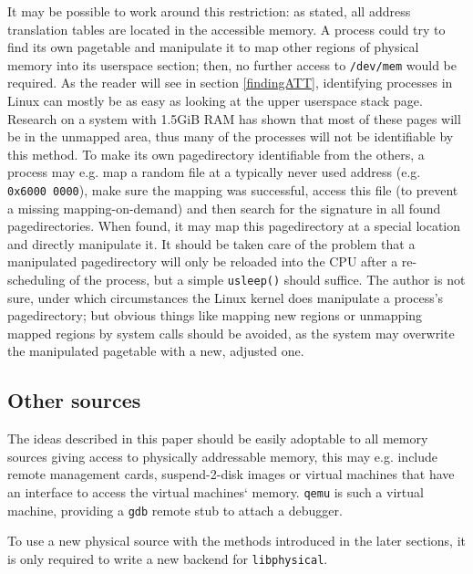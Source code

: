 It may be possible to work around this restriction: as stated, all address
translation tables are located in the accessible memory. A process could try to
find its own pagetable and manipulate it to map other regions of physical memory
into its userspace section; then, no further access to \texttt{/dev/mem} would
be required. As the reader will see in section \ref{findingATT}, identifying
processes in Linux can mostly be as easy as looking at the upper userspace stack
page.  Research on a system with 1.5GiB RAM has shown that most of these pages
will be in the unmapped area, thus many of the processes will not be
identifiable by this method. To make its own pagedirectory identifiable from the
others, a process may e.g. map a random file at a typically never used address
(e.g.  \texttt{0x6000~0000}), make sure the mapping was successful, access this
file (to prevent a missing mapping-on-demand) and then search for the signature
in all found pagedirectories. When found, it may map this pagedirectory at a
special location and directly manipulate it. It should be taken care of the
problem that a manipulated pagedirectory will only be reloaded into the CPU
after a re-scheduling of the process, but a simple \texttt{usleep()} should
suffice. The author is not sure, under which circumstances the Linux kernel does
manipulate a process's pagedirectory; but obvious things like mapping new
regions or unmapping mapped regions by system calls should be avoided, as the
system may overwrite the manipulated pagetable with a new, adjusted one.



\subsection{Other sources}

The ideas described in this paper should be easily adoptable to all memory
sources giving access to physically addressable memory, this may e.g. include
remote management cards, suspend-2-disk images or virtual machines that have an
interface to access the virtual machines` memory.  \texttt{qemu} is such a
virtual machine, providing a \texttt{gdb} remote stub to attach a debugger.

To use a new physical source with the methods introduced in the later sections,
it is only required to write a new backend for \texttt{libphysical}.

